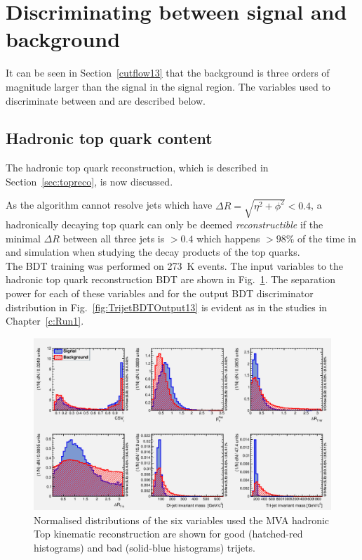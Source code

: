 \section{Discriminating between signal and background}
\label{sec:discriminating13}
It can be seen in Section~\ref{cutflow13} that the \ttbar background is three orders of magnitude larger than the \tttt signal in the signal region. The variables used to discriminate between \ttbar and \tttt are described below.

\subsection{Hadronic top quark content}
\label{sec:topContent13}
The hadronic top quark reconstruction, which is described in Section~\ref{sec:topreco}, is now discussed.

As the \antikt algorithm cannot resolve jets which have $\Delta R = \sqrt{  \eta^{2} + \phi^{2} } < 0.4$, a hadronically decaying top quark can only be deemed \emph{reconstructible} if the minimal $\Delta R$ between all three jets is $> 0.4$ which happens $> 98\%$ of the time in \ttbar and \tttt simulation when studying the decay products of the top quarks.\\
The BDT training was performed on 273~K \ttbar events. The input variables to the hadronic top quark reconstruction BDT are shown in Fig.~\ref{fig:TrijetBDTInputFeatures13}. The separation power for each of these variables and for the output BDT discriminator distribution in Fig.~\ref{fig:TrijetBDTOutput13} is evident as in the \runone studies in Chapter~\ref{c:Run1}. 

\begin{figure}[ht!]
\centering
\includegraphics[width=\linewidth]{images/Run2/variables_id_c1.pdf}
\caption{Normalised distributions of the six variables used the MVA hadronic Top kinematic reconstruction are shown for good (hatched-red histograms) and bad (solid-blue histograms) trijets.}
\label{fig:TrijetBDTInputFeatures13}
\end{figure}

